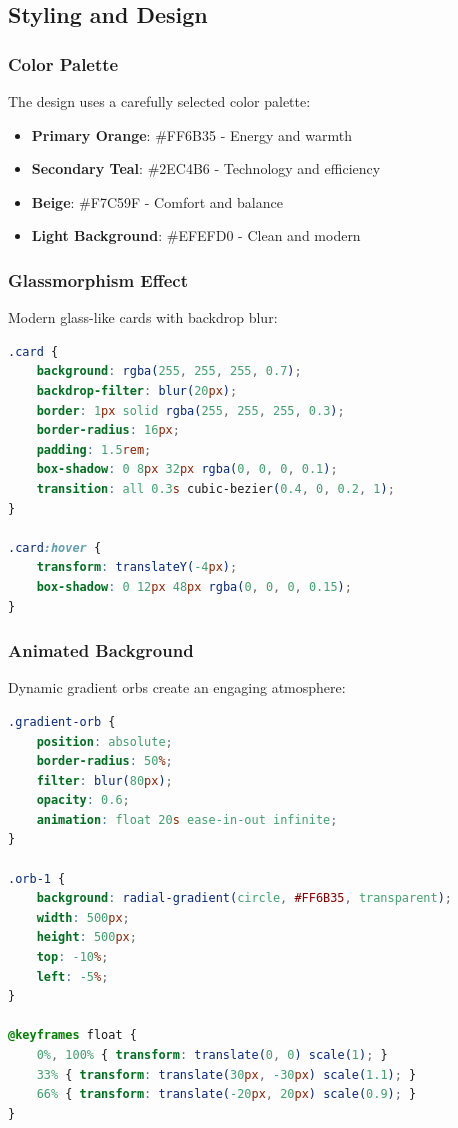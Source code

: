 \documentclass[12pt,a4paper]{article}
\begin{document}
\subsection{Styling and Design}

\subsubsection{Color Palette}
The design uses a carefully selected color palette:
\begin{itemize}[leftmargin=*]
    \item \textbf{Primary Orange}: \#FF6B35 - Energy and warmth
    \item \textbf{Secondary Teal}: \#2EC4B6 - Technology and efficiency
    \item \textbf{Beige}: \#F7C59F - Comfort and balance
    \item \textbf{Light Background}: \#EFEFD0 - Clean and modern
\end{itemize}

\subsubsection{Glassmorphism Effect}
Modern glass-like cards with backdrop blur:

\begin{lstlisting}[language=CSS, caption=Glassmorphism card styling]
.card {
    background: rgba(255, 255, 255, 0.7);
    backdrop-filter: blur(20px);
    border: 1px solid rgba(255, 255, 255, 0.3);
    border-radius: 16px;
    padding: 1.5rem;
    box-shadow: 0 8px 32px rgba(0, 0, 0, 0.1);
    transition: all 0.3s cubic-bezier(0.4, 0, 0.2, 1);
}

.card:hover {
    transform: translateY(-4px);
    box-shadow: 0 12px 48px rgba(0, 0, 0, 0.15);
}
\end{lstlisting}

\subsubsection{Animated Background}
Dynamic gradient orbs create an engaging atmosphere:

\begin{lstlisting}[language=CSS, caption=Animated gradient orbs]
.gradient-orb {
    position: absolute;
    border-radius: 50%;
    filter: blur(80px);
    opacity: 0.6;
    animation: float 20s ease-in-out infinite;
}

.orb-1 {
    background: radial-gradient(circle, #FF6B35, transparent);
    width: 500px;
    height: 500px;
    top: -10%;
    left: -5%;
}

@keyframes float {
    0%, 100% { transform: translate(0, 0) scale(1); }
    33% { transform: translate(30px, -30px) scale(1.1); }
    66% { transform: translate(-20px, 20px) scale(0.9); }
}
\end{lstlisting}
\end{document}
